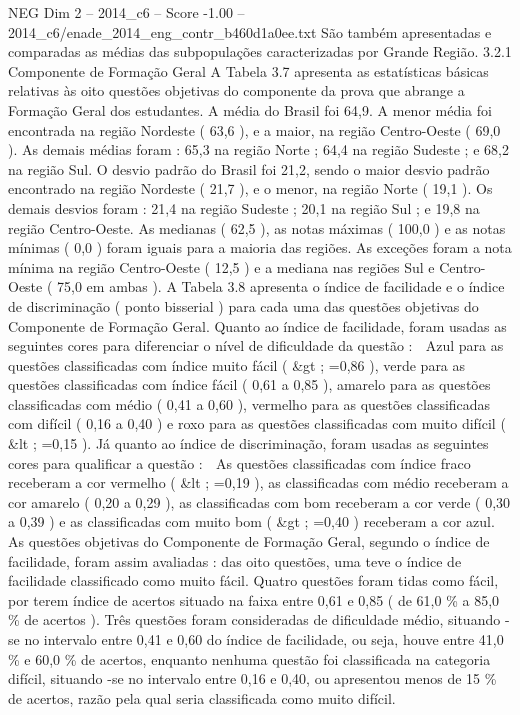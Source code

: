\begin{textsample}{NEG Dim 2 – 2014\_c6 – Score -1.00 – 2014\_c6/enade\_2014\_eng\_contr\_b460d1a0ee.txt}
São também apresentadas e comparadas as médias das subpopulações caracterizadas por Grande Região. 3.2.1 Componente de Formação Geral A Tabela 3.7 apresenta as estatísticas básicas relativas às oito questões objetivas do componente da prova que abrange a Formação Geral dos estudantes.
A média do Brasil foi 64,9.
A menor média foi encontrada na região Nordeste ( 63,6 ), e a maior, na região Centro-Oeste ( 69,0 ).
As demais médias foram : 65,3 na região Norte ; 64,4 na região Sudeste ; e 68,2 na região Sul.
O desvio padrão do Brasil foi 21,2, sendo o maior desvio padrão encontrado na região Nordeste ( 21,7 ), e o menor, na região Norte ( 19,1 ).
Os demais desvios foram : 21,4 na região Sudeste ; 20,1 na região Sul ; e 19,8 na região Centro-Oeste.
As medianas ( 62,5 ), as notas máximas ( 100,0 ) e as notas mínimas ( 0,0 ) foram iguais para a maioria das regiões.
As exceções foram a nota mínima na região Centro-Oeste ( 12,5 ) e a mediana nas regiões Sul e Centro-Oeste ( 75,0 em ambas ).
A Tabela 3.8 apresenta o índice de facilidade e o índice de discriminação ( ponto bisserial ) para cada uma das questões objetivas do Componente de Formação Geral.
Quanto ao índice de facilidade, foram usadas as seguintes cores para diferenciar o nível de dificuldade da questão :  Azul para as questões classificadas com índice muito fácil ( \&gt ; =0,86 ), verde para as questões classificadas com índice fácil ( 0,61 a 0,85 ), amarelo para as questões classificadas com médio ( 0,41 a 0,60 ), vermelho para as questões classificadas com difícil ( 0,16 a 0,40 ) e roxo para as questões classificadas com muito difícil ( \&lt ; =0,15 ).
Já quanto ao índice de discriminação, foram usadas as seguintes cores para qualificar a questão :  As questões classificadas com índice fraco receberam a cor vermelho ( \&lt ; =0,19 ), as classificadas com médio receberam a cor amarelo ( 0,20 a 0,29 ), as classificadas com bom receberam a cor verde ( 0,30 a 0,39 ) e as classificadas com muito bom ( \&gt ; =0,40 ) receberam a cor azul.
As questões objetivas do Componente de Formação Geral, segundo o índice de facilidade, foram assim avaliadas : das oito questões, uma teve o índice de facilidade classificado como muito fácil.
Quatro questões foram tidas como fácil, por terem índice de acertos situado na faixa entre 0,61 e 0,85 ( de 61,0 \% a 85,0 \% de acertos ).
Três questões foram consideradas de dificuldade médio, situando -se no intervalo entre 0,41 e 0,60 do índice de facilidade, ou seja, houve entre 41,0 \% e 60,0 \% de acertos, enquanto nenhuma questão foi classificada na categoria difícil, situando -se no intervalo entre 0,16 e 0,40, ou apresentou menos de 15 \% de acertos, razão pela qual seria classificada como muito difícil.

\end{textsample}

